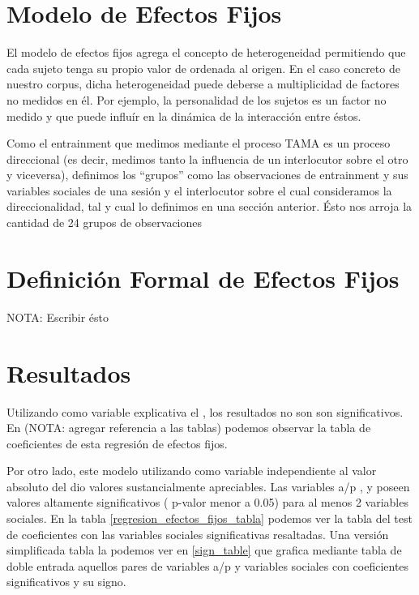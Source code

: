 \section{Modelo de Efectos Fijos}


\newcommand{\slopeestim}[1] { $\estslope \sim #1$ }

El modelo de efectos fijos agrega el concepto de heterogeneidad permitiendo que cada sujeto tenga su propio valor de ordenada al origen. En el caso concreto de nuestro corpus, dicha heterogeneidad puede deberse a multiplicidad de factores no medidos en él. Por ejemplo, la personalidad de los sujetos es un factor no medido y que puede influír en la dinámica de la interacción entre éstos.

Como el entrainment que medimos mediante el proceso TAMA es un proceso direccional (es decir, medimos tanto la influencia de un interlocutor sobre el otro y viceversa), definimos los ``grupos'' como las observaciones de entrainment y sus variables sociales de una sesión y el interlocutor sobre el cual consideramos la direccionalidad, tal y cual lo definimos en una sección anterior. Ésto nos arroja la cantidad de 24 grupos de observaciones



\section{Definición Formal de Efectos Fijos}

NOTA: Escribir ésto

\section{Resultados}

Utilizando como variable explicativa el \entrainment, los resultados no son son significativos. En (NOTA: agregar referencia a las tablas) podemos observar la tabla de coeficientes de esta regresión de efectos fijos.

Por otro lado, este modelo utilizando como variable independiente al valor absoluto del \entrainment dio valores sustancialmente apreciables. Las variables a/p \ENGMAX, \FOMEAN y \NOISETOHARMONICS poseen valores altamente significativos ( p-valor menor a 0.05) para al menos 2 variables sociales. En la tabla \ref{regresion_efectos_fijos_tabla} podemos ver la tabla del test de coeficientes con las variables sociales significativas resaltadas. Una versión simplificada tabla la podemos ver en \ref{sign_table} que grafica mediante tabla de doble entrada aquellos pares de variables a/p y variables sociales con coeficientes significativos y su signo.

